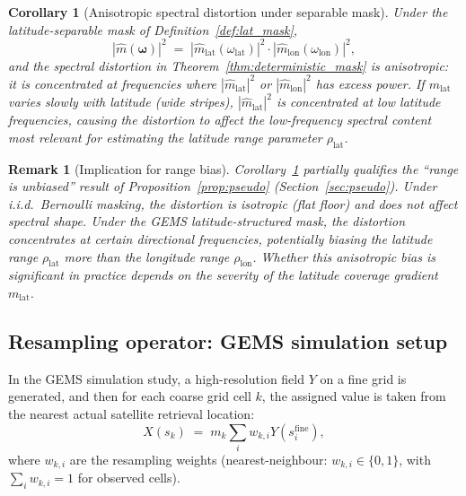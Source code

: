 \documentclass[12pt]{article}
\newtheorem{corollary}{Corollary}
\newtheorem{remark}{Remark}
\begin{document}
\begin{corollary}[Anisotropic spectral distortion under separable mask]
\label{cor:anisotropic}
Under the latitude-separable mask of Definition~\ref{def:lat_mask},
\[
    |\hat{m}(\boldsymbol{\omega})|^2
    \;=\; |\hat{m}_{\mathrm{lat}}(\omega_{\mathrm{lat}})|^2\cdot
           |\hat{m}_{\mathrm{lon}}(\omega_{\mathrm{lon}})|^2,
\]
and the spectral distortion in Theorem~\ref{thm:deterministic_mask} is
\emph{anisotropic}: it is concentrated at frequencies where
$|\hat{m}_{\mathrm{lat}}|^2$ or $|\hat{m}_{\mathrm{lon}}|^2$ has excess
power.
If $m_{\mathrm{lat}}$ varies slowly with latitude (wide stripes),
$|\hat{m}_{\mathrm{lat}}|^2$ is concentrated at low latitude frequencies,
causing the distortion to affect the low-frequency spectral content most
relevant for estimating the latitude range parameter $\rho_{\mathrm{lat}}$.
\end{corollary}

\begin{remark}[Implication for range bias]
Corollary~\ref{cor:anisotropic} partially qualifies the ``range is
unbiased'' result of Proposition~\ref{prop:pseudo} (Section~\ref{sec:pseudo}).
Under i.i.d.\ Bernoulli masking, the distortion is isotropic (flat floor)
and does not affect spectral shape.
Under the GEMS latitude-structured mask, the distortion concentrates at
certain directional frequencies, potentially biasing the latitude range
$\rho_{\mathrm{lat}}$ more than the longitude range $\rho_{\mathrm{lon}}$.
Whether this anisotropic bias is significant in practice depends on the
severity of the latitude coverage gradient $m_{\mathrm{lat}}$.
\end{remark}

\subsection{Resampling operator: GEMS simulation setup}
\label{sec:resample}

In the GEMS simulation study, a high-resolution field $Y$ on a fine grid
is generated, and then for each coarse grid cell $k$, the assigned value
is taken from the nearest actual satellite retrieval location:
\[
    X(s_k) \;=\; m_k \sum_i w_{k,i} Y(s_i^{\mathrm{fine}}),
\]
where $w_{k,i}$ are the resampling weights (nearest-neighbour: $w_{k,i}
\in \{0,1\}$, with $\sum_i w_{k,i} = 1$ for observed cells).
\end{document}
